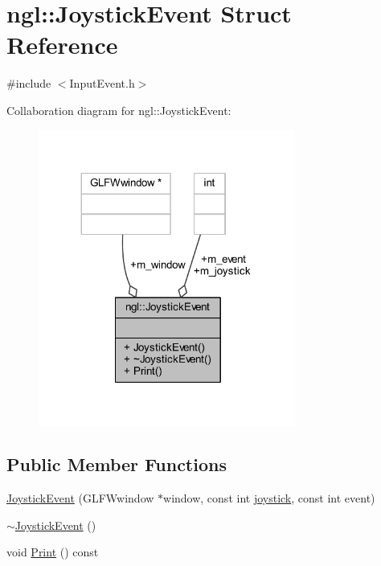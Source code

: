 \hypertarget{structngl_1_1_joystick_event}{}\section{ngl\+:\+:Joystick\+Event Struct Reference}
\label{structngl_1_1_joystick_event}


{\ttfamily \#include $<$Input\+Event.\+h$>$}



Collaboration diagram for ngl\+:\+:Joystick\+Event\+:
\nopagebreak
\begin{figure}[H]
\begin{center}
\leavevmode
\includegraphics[width=239pt]{structngl_1_1_joystick_event__coll__graph}
\end{center}
\end{figure}
\subsection*{Public Member Functions}
\begin{DoxyCompactItemize}
\item 
\mbox{\hyperlink{structngl_1_1_joystick_event_a4c67974cb27d737b5c5ab3d8929d4824}{Joystick\+Event}} (G\+L\+F\+Wwindow $\ast$window, const int \mbox{\hyperlink{namespacengl_a5b20ff50635da5e3adb6bec00c062497a2ed69833bf8cb33c80eaf0daa892400e}{joystick}}, const int event)
\item 
\mbox{\hyperlink{structngl_1_1_joystick_event_abbd62217bcfd947bc9594f778db145a7}{$\sim$\+Joystick\+Event}} ()
\item 
void \mbox{\hyperlink{structngl_1_1_joystick_event_a0a68e770b6e206b97db6e294cdfe3186}{Print}} () const
\end{DoxyCompactItemize}
